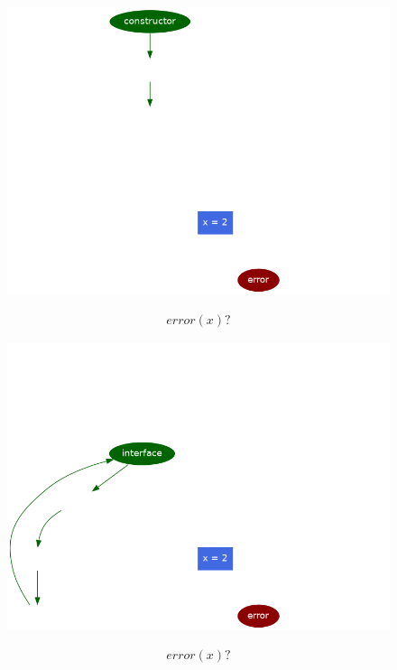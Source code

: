 \documentclass[aspectratio=169,10pt]{beamer}
\begin{document}
\begin{frame}[fragile]
\begin{figure}
\noindent\begin{minipage}{.49\textwidth}
	\includegraphics[scale=0.3]{images/state_machine_counterexample_path_constructor}
\end{minipage}
\noindent\begin{minipage}{.49\textwidth}
{\small
\begin{align*}
	error(x) ?
\end{align*}
}%
\end{minipage}
\end{figure}
\end{frame}

\begin{frame}[fragile]
\begin{figure}
\noindent\begin{minipage}{.49\textwidth}
	\includegraphics[scale=0.3]{images/state_machine_counterexample_path_1}
\end{minipage}
\noindent\begin{minipage}{.49\textwidth}
{\small
\begin{align*}
	error(x) ?
\end{align*}
}%
\end{minipage}
\end{figure}
\end{frame}
\end{document}
